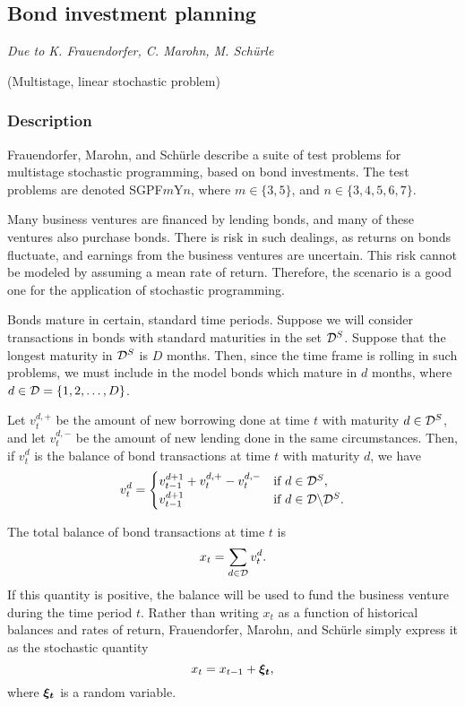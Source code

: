 \subsection{Bond investment planning}%
\emph{Due to K. Frauendorfer, C. Marohn, M. Sch\"{u}rle \cite{frauendorfer97}}%

\noindent(Multistage, linear stochastic problem)

\vspace{3mm}
\subsubsection{Description}
Frauendorfer, Marohn, and Sch\"{u}rle \cite{frauendorfer97} describe a suite of test problems for multistage stochastic programming, based on bond investments.  The test problems are denoted SGPF$m$Y$n$, where $m \in \{3,5\}$, and $n \in \{3,4,5,6,7\}$.  

Many business ventures are financed by lending bonds, and many of these ventures also purchase bonds.  There is risk in such dealings, as returns on bonds fluctuate, and earnings from the business ventures are uncertain.  This risk cannot be modeled by assuming a mean rate of return.  Therefore, the scenario is a good one for the application of stochastic programming.

Bonds mature in certain, standard time periods.  Suppose we will consider transactions in bonds with standard maturities in the set ${\cal D}^S$.  Suppose that the longest maturity in ${\cal D}^S$ is $D$ months.  Then, since the time frame is rolling in such problems, we must include in the model bonds which mature in $d$ months, where $d \in {\cal D} = \{1, 2, \ldots, D\}$.

Let $v_t^{d,+}$ be the amount of new borrowing done at time $t$ with maturity $d \in {\cal D}^S$, and let $v_t^{d,-}$ be the amount of new lending done in the same circumstances.  Then, if $v_t^d$ is the balance of bond transactions at time $t$ with maturity $d$, we have
\begin{equation*}
v_t^d = 
\begin{cases}
	v_{t-1}^{d+1} + v_t^{d,+} - v_t^{d,-} & \text{if $d \in {\cal D}^S$},\\
	v_{t-1}^{d+1}						&	\text{if $d \in {\cal D} \backslash {\cal D}^S$}.
\end{cases}
\end{equation*}

The total balance of bond transactions at time $t$ is 
\begin{equation*}
x_t = \sum_{d \in {\cal D}} v_t^d.
\end{equation*}
If this quantity is positive, the balance will be used to fund the business venture during the time period $t$.  Rather than writing $x_t$ as a function of historical balances and rates of return, Frauendorfer, Marohn, and Sch\"{u}rle \cite{frauendorfer97} simply express it as the stochastic quantity
\begin{equation*}
x_t = x_{t-1} + \mathbf{\boldsymbol{\xi_t}},
\end{equation*}
where $\mathbf{\boldsymbol{\xi_t}}$ is a random variable.


